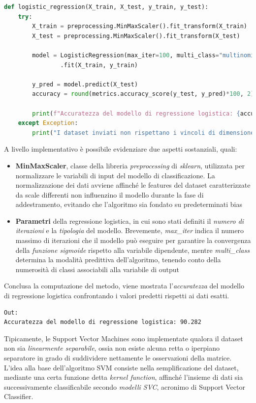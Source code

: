 \documentclass{article}
\begin{document}
    \begin{lstlisting}[language=Python]
def logistic_regression(X_train, X_test, y_train, y_test):
    try:
        X_train = preprocessing.MinMaxScaler().fit_transform(X_train)
        X_test = preprocessing.MinMaxScaler().fit_transform(X_test)

        model = LogisticRegression(max_iter=100, multi_class="multinomial") 
                .fit(X_train, y_train)

        y_pred = model.predict(X_test)
        accuracy = round(metrics.accuracy_score(y_test, y_pred)*100, 2)
        
        print(f"Accuratezza del modello di regressione logistica: {accuracy}")
    except Exception:
        print("I dataset inviati non rispettano i vincoli di dimensione")        
    \end{lstlisting}
    A livello implementativo è possibile evidenziare due aspetti sostanziali, quali:
    \begin{itemize}
        \renewcommand{\labelitemi}{-}
        \setlength\parskip{0pt}
        \item \textbf{MinMaxScaler}, classe della libreria \textit{preprocessing} di \textit{sklearn}, utilizzata per normalizzare le variabili di input del modello di classificazione. La normalizzazione dei dati avviene affinché le features del dataset caratterizzate da scale differenti non influenzino il modello durante la fase di addestramento, evitando che l'algoritmo sia fondato su predeterminati bias
        \item \textbf{Parametri} della regressione logistica, in cui sono stati definiti il \textit{numero  di iterazioni} e la \textit{tipologia} del modello. Brevemente, \textit{max\_iter} indica il numero massimo di iterazioni che il modello può eseguire per garantire la convergenza della \textit{funzione sigmoide} rispetto alla variabile dipendente, mentre \textit{multi\_class} determina la modalità predittiva dell'algoritmo, tenendo conto della numerosità di classi associabili alla variabile di output
    \end{itemize}
    Conclusa la computazione del metodo, viene mostrata l'\textit{accuratezza} del modello di regressione logistica confrontando i valori predetti rispetti ai dati esatti.
        \begin{lstlisting}[style=Jupyter]
Out:
Accuratezza del modello di regressione logistica: 90.282
    \end{lstlisting}
    Tipicamente, le Support Vector Machines sono implementate qualora il dataset non sia \textit{linearmente separabile}, ossia non esiste alcuna retta o iperpiano separatore in grado di suddividere nettamente le osservazioni della matrice. L'idea alla base dell'algoritmo SVM consiste nella semplificazione del dataset, mediante una certa funzione detta \textit{kernel function}, affinché l'insieme di dati sia successivamente classificabile secondo \textit{modelli SVC}, acronimo di Support Vector Classifier. \vspace*{7pt}\\
\end{document}
